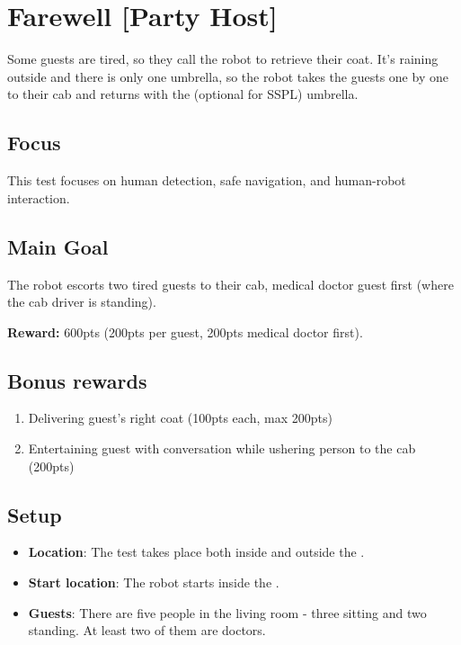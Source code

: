 \section{Farewell [Party Host]}
\label{test:farewell}
Some guests are tired, so they call the robot to retrieve their coat.
It's raining outside and there is only one umbrella, so the robot takes the guests one by one to their cab and returns with the (optional for SSPL) umbrella.

\subsection*{Focus}
This test focuses on human detection, safe navigation, and human-robot interaction.

\subsection*{Main Goal}
The robot escorts two tired guests to their cab, medical doctor guest first (where the cab driver is standing).

\noindent\textbf{Reward:} 600pts (200pts per guest, 200pts medical doctor first).

\subsection*{Bonus rewards}
\begin{enumerate}[nosep]
	\item Delivering guest's right coat (100pts each, max 200pts)
	\item Entertaining guest with conversation while ushering person to the cab (200pts)	
\end{enumerate}


\subsection*{Setup}
\begin{itemize}
	\item \textbf{Location}: The test takes place both inside and outside the \Arena{}.
	\item \textbf{Start location}: The robot starts inside the \Arena{}.
	\item \textbf{Guests}: There are five people in the living room - three sitting and two standing. At least two of them are doctors.
\end{itemize}

